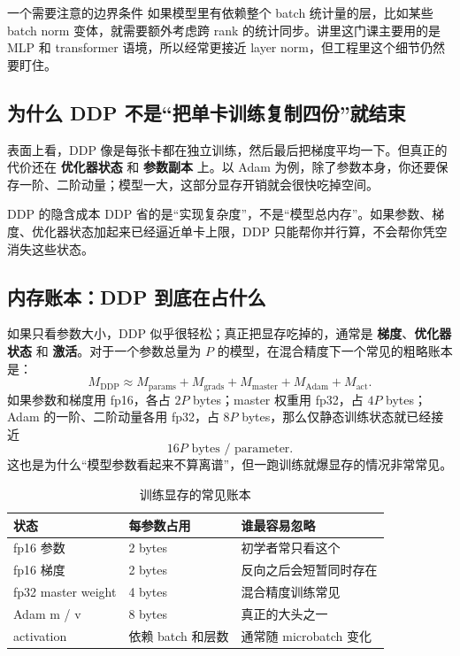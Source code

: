 \begin{warningbox}{一个需要注意的边界条件}
如果模型里有依赖整个 batch 统计量的层，比如某些 batch norm 变体，就需要额外考虑跨 rank 的统计同步。讲里这门课主要用的是 MLP 和 transformer 语境，所以经常更接近 layer norm，但工程里这个细节仍然要盯住。
\end{warningbox}

\subsection{为什么 DDP 不是“把单卡训练复制四份”就结束}

表面上看，DDP 像是每张卡都在独立训练，然后最后把梯度平均一下。但真正的代价还在 \textbf{优化器状态} 和 \textbf{参数副本} 上。以 Adam 为例，除了参数本身，你还要保存一阶、二阶动量；模型一大，这部分显存开销就会很快吃掉空间。

\begin{knowledgebox}{DDP 的隐含成本}
DDP 省的是“实现复杂度”，不是“模型总内存”。如果参数、梯度、优化器状态加起来已经逼近单卡上限，DDP 只能帮你并行算，不会帮你凭空消失这些状态。
\end{knowledgebox}

\subsection{内存账本：DDP 到底在占什么}

如果只看参数大小，DDP 似乎很轻松；真正把显存吃掉的，通常是 \textbf{梯度}、\textbf{优化器状态} 和 \textbf{激活}。对于一个参数总量为 $P$ 的模型，在混合精度下一个常见的粗略账本是：
\[
M_{\text{DDP}} \approx M_{\text{params}} + M_{\text{grads}} + M_{\text{master}} + M_{\text{Adam}} + M_{\text{act}}.
\]
如果参数和梯度用 fp16，各占 $2P$ bytes；master 权重用 fp32，占 $4P$ bytes；Adam 的一阶、二阶动量各用 fp32，占 $8P$ bytes，那么仅静态训练状态就已经接近
\[
16P \text{ bytes / parameter}.
\]
这也是为什么“模型参数看起来不算离谱”，但一跑训练就爆显存的情况非常常见。

\begin{table}[H]
\centering
\small
\begin{tabular}{p{3.4cm}p{3.6cm}p{4.4cm}}
\toprule
\textbf{状态} & \textbf{每参数占用} & \textbf{谁最容易忽略} \\
\midrule
fp16 参数 & 2 bytes & 初学者常只看这个 \\
fp16 梯度 & 2 bytes & 反向之后会短暂同时存在 \\
fp32 master weight & 4 bytes & 混合精度训练常见 \\
Adam m / v & 8 bytes & 真正的大头之一 \\
activation & 依赖 batch 和层数 & 通常随 microbatch 变化 \\
\bottomrule
\end{tabular}
\caption{训练显存的常见账本}
\end{table}

